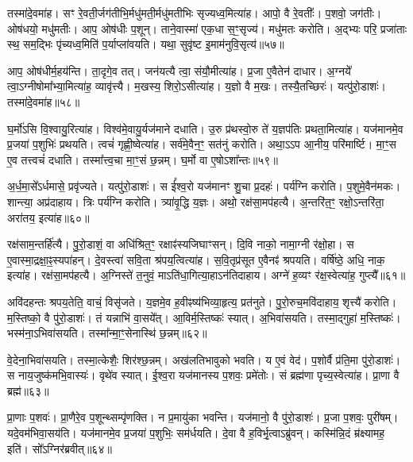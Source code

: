 तस्मा॑दे॒वमा॑ह।
सꣳ रे॒वती॒र्जग॑तीभि॒र्मधु॑मती॒र्मधु॑मतीभिः सृज्यध्व॒मित्या॑ह।
आपो॒ वै रे॒वतीः᳚।
प॒शवो॒ जग॑तीः।
ओष॑धयो॒ मधु॑मतीः।
आप॒ ओष॑धीः प॒शून्।
ताने॒वास्मा॑ एक॒धा स॒ꣳ॒सृज्य॑।
मधु॑मतः करोति।
अ॒द्भ्यः परि॒ प्रजा॑ताः स्थ॒ सम॒द्भिः पृ॑च्यध्व॒मिति॑ प॒र्याप्ला॑वयति।
यथा॒ सुवृ॑ष्ट इ॒माम॑नुवि॒सृत्य॑॥५७॥

आप॒ ओष॑धीर्म॒हय॑न्ति।
ता॒दृगे॒व तत्।
जन॑यत्यै त्वा॒ संयौ॒मीत्या॑ह।
प्र॒जा ए॒वैतेन॑ दाधार।
अ॒ग्नये᳚ त्वा॒\-ऽग्नीषोमा᳚भ्या॒मित्या॑ह॒ व्यावृ॑त्त्यै।
म॒खस्य॒ शिरो॒\-ऽसीत्या॑ह।
य॒ज्ञो वै म॒खः।
तस्यै॒तच्छिरः॑।
यत्पु॑रो॒डाशः॑।
तस्मा॑दे॒वमा॑ह॥५८॥

घ॒र्मो॑ऽसि वि॒श्वायु॒रित्या॑ह।
विश्व॑मे॒वायु॒र्यज॑माने दधाति।
उ॒रु प्र॑थस्वो॒रु ते॑ य॒ज्ञप॑तिः प्रथता॒मित्या॑ह।
यज॑मानमे॒व प्र॒जया॑ प॒शुभिः॑ प्रथयति।
त्वचं॑ गृह्णी॒ष्वेत्या॑ह।
सर्व॑मे॒वैन॒ꣳ॒ सत॑नुं करोति।
अथा॒ऽऽप आ॒नीय॒ परि॑मार्ष्टि।
मा॒ꣳ॒स ए॒व तत्त्वचं॑ दधाति।
तस्मा᳚त्त्व॒चा मा॒ꣳ॒सं छ॒न्नम्।
घ॒र्मो वा ए॒षो\-ऽशा᳚न्तः॥५९॥

अ॒र्ध॒मा॒से᳚\-ऽर्धमासे॒ प्रवृ॑ज्यते।
यत्पु॑रो॒डाशः॑।
स ई᳚श्व॒रो यज॑मानꣳ शु॒चा प्र॒दहः॑।
पर्य॑ग्नि करोति।
प॒शुमे॒वैन॑मकः।
शान्त्या॒ अप्र॑दाहाय।
त्रिः पर्य॑ग्नि करोति।
त्र्या॑वृ॒द्धि य॒ज्ञः।
अथो॒ रक्ष॑सा॒मप॑हत्यै।
अ॒न्तरि॑त॒ꣳ॒ रक्षो॒\-ऽन्तरि॑ता॒ अरा॑तय॒ इत्या॑ह॥६०॥

रक्ष॑साम॒न्तर्\mbox{}हि॑त्यै।
पु॒रो॒डाशं॒ वा अधि॑श्रित॒ꣳ॒ रक्षाꣴ॑स्य\-जिघाꣳसन्।
दि॒वि नाको॒ नामा॒ग्नी र॑क्षो॒हा।
स ए॒वास्मा॒द्रक्षा॒ꣴ॒\-स्यपा॑\-हन्।
दे॒वस्त्वा॑ सवि॒ता श्र॑पय॒त्वित्या॑ह।
स॒वि॒तृप्र॑सूत ए॒वैनꣴ॑ श्रपयति।
वर्\mbox{}षि॑ष्ठे॒ अधि॒ नाक॒ इत्या॑ह।
रक्ष॑सा॒मप॑हत्यै।
अ॒ग्निस्ते॑ त॒नुवं॒ माऽति॑धा॒गित्या॒हा\-ऽन॑तिदाहाय।
अग्ने॑ ह॒व्यꣳ र॑क्ष॒स्वेत्या॑ह॒ गुप्त्यै᳚॥६१॥

अवि॑दहन्तः श्रपय॒तेति॒ वाचं॒ विसृ॑जते।
य॒ज्ञमे॒व ह॒वीꣴष्य॑भि\-व्या॒हृत्य॒ प्रत॑नुते।
पु॒रो॒रुच॒मवि॑दाहाय॒ शृत्त्यै॑ करोति।
म॒स्तिष्को॒ वै पु॑रो॒डाशः॑।
तं यन्नाभि॑ वा॒सये᳚त्।
आ॒विर्म॒स्तिष्कः॑ स्यात्।
अ॒भिवा॑सयति।
तस्मा॒द्गुहा॑ म॒स्तिष्कः॑।
भस्म॑ना॒\-ऽभिवा॑सयति।
तस्मा᳚न्मा॒ꣳ॒सेनास्थि॑ छ॒न्नम्॥६२॥

वे॒देना॒भिवा॑सयति।
तस्मा॒त्केशैः॒ शिर॑श्छ॒न्नम्।
अख॑लति\-भावुको भवति।
य ए॒वं वेद॑।
प॒शोर्वै प्र॑ति॒मा पु॑रो॒डाशः॑।
स नाय॒जुष्क॑मभि॒वास्यः॑।
वृथे॑व स्यात्।
ई॒श्व॒रा यज॑मानस्य प॒शवः॒ प्रमे॑तोः।
सं ब्रह्म॑णा पृच्य॒स्वेत्या॑ह।
प्रा॒णा वै ब्रह्म॑॥६३॥

प्रा॒णाः प॒शवः॑।
प्रा॒णैरे॒व प॒शून्थ्सम्पृ॑णक्ति।
न प्र॒मायु॑का भवन्ति।
यज॑मानो॒ वै पु॑रो॒डाशः॑।
प्र॒जा प॒शवः॒ पुरी॑षम्।
यदे॒वम॑भिवा॒सय॑ति।
यज॑मानमे॒व प्र॒जया॑ प॒शुभिः॒ सम॑र्धयति।
दे॒वा वै ह॒विर्भृ॒त्वा\-ऽब्रु॑वन्।
कस्मि॑न्नि॒दं म्र॑क्ष्यामह॒ इति॑।
सो᳚ऽग्निर॑ब्रवीत्॥६४॥

